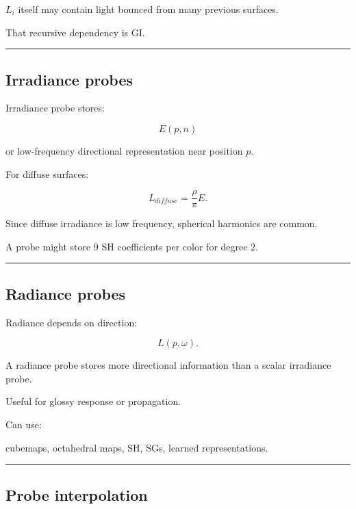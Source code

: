 \(L_i\) itself may contain light bounced from many previous surfaces.

That recursive dependency is GI.

\begin{center}\rule{0.5\linewidth}{0.5pt}\end{center}

\subsection{Irradiance probes}\label{04-visual-computing-ii-ch040-irradiance-probes}

\hypertarget{04-visual-computing-ii-ch040-irradiance-probes}{}

Irradiance probe stores:

\[
E(p,n)
\]

or low-frequency directional representation near position \(p\).

For diffuse surfaces:

\[
L_{diffuse}
=
\frac{\rho}{\pi}
E.
\]

Since diffuse irradiance is low frequency, spherical harmonics are common.

A probe might store 9 SH coefficients per color for degree 2.

\begin{center}\rule{0.5\linewidth}{0.5pt}\end{center}

\subsection{Radiance probes}\label{04-visual-computing-ii-ch040-radiance-probes}

\hypertarget{04-visual-computing-ii-ch040-radiance-probes}{}

Radiance depends on direction:

\[
L(p,\omega).
\]

A radiance probe stores more directional information than a scalar irradiance probe.

Useful for glossy response or propagation.

Can use:

cubemaps, octahedral maps, SH, SGs, learned representations.

\begin{center}\rule{0.5\linewidth}{0.5pt}\end{center}

\subsection{Probe interpolation}\label{04-visual-computing-ii-ch040-probe-interpolation}

